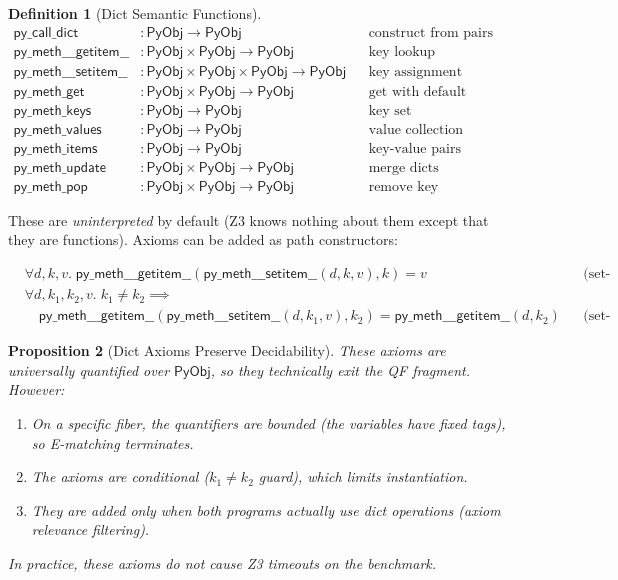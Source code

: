 \documentclass[11pt,a4paper]{report}
\theoremstyle{definition}
\newtheorem{definition}{Definition}[chapter]
\theoremstyle{plain}
\newtheorem{proposition}[definition]{Proposition}
\newcommand{\PyObj}{\mathsf{PyObj}}
\begin{document}
\begin{definition}[Dict Semantic Functions]
\begin{align}
  \mathsf{py\_call\_dict} &: \PyObj \to \PyObj
    && \text{construct from pairs} \\
  \mathsf{py\_meth\_\_\_getitem\_\_} &: \PyObj \times \PyObj \to \PyObj
    && \text{key lookup} \\
  \mathsf{py\_meth\_\_\_setitem\_\_} &: \PyObj \times \PyObj \times
    \PyObj \to \PyObj
    && \text{key assignment (returns new dict)} \\
  \mathsf{py\_meth\_get} &: \PyObj \times \PyObj \to \PyObj
    && \text{get with default} \\
  \mathsf{py\_meth\_keys} &: \PyObj \to \PyObj
    && \text{key set} \\
  \mathsf{py\_meth\_values} &: \PyObj \to \PyObj
    && \text{value collection} \\
  \mathsf{py\_meth\_items} &: \PyObj \to \PyObj
    && \text{key-value pairs} \\
  \mathsf{py\_meth\_update} &: \PyObj \times \PyObj \to \PyObj
    && \text{merge dicts} \\
  \mathsf{py\_meth\_pop} &: \PyObj \times \PyObj \to \PyObj
    && \text{remove key}
\end{align}
\end{definition}

These are \emph{uninterpreted} by default (Z3 knows nothing about
them except that they are functions).  Axioms can be added as path
constructors:

\begin{align}
  &\forall d, k, v.\; \mathsf{py\_meth\_\_\_getitem\_\_}(
    \mathsf{py\_meth\_\_\_setitem\_\_}(d, k, v), k) = v
    && \text{(set-then-get)} \\
  &\forall d, k_1, k_2, v.\; k_1 \neq k_2 \implies \nonumber \\
  &\quad \mathsf{py\_meth\_\_\_getitem\_\_}(
    \mathsf{py\_meth\_\_\_setitem\_\_}(d, k_1, v), k_2) =
    \mathsf{py\_meth\_\_\_getitem\_\_}(d, k_2)
    && \text{(set-then-get-other)}
\end{align}

\begin{proposition}[Dict Axioms Preserve Decidability]
These axioms are universally quantified over $\PyObj$, so they
technically exit the QF fragment.  However:
\begin{enumerate}
  \item On a specific fiber, the quantifiers are bounded (the
    variables have fixed tags), so E-matching terminates.
  \item The axioms are \emph{conditional} ($k_1 \neq k_2$ guard),
    which limits instantiation.
  \item They are added only when both programs actually use dict
    operations (axiom relevance filtering).
\end{enumerate}
In practice, these axioms do not cause Z3 timeouts on the benchmark.
\end{proposition}
\end{document}
